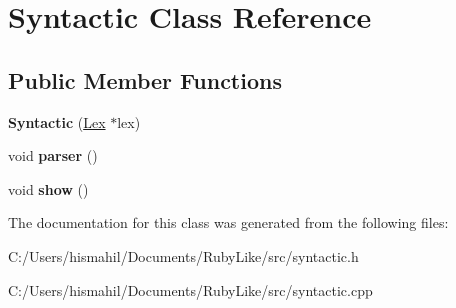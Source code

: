 \hypertarget{class_syntactic}{\section{Syntactic Class Reference}
\label{class_syntactic}
}
\subsection*{Public Member Functions}
\begin{DoxyCompactItemize}
\item 
\hypertarget{class_syntactic_ac94e5b2e82e2c0d2ad751b3f5ada8061}{{\bfseries Syntactic} (\hyperlink{class_lex}{Lex} $\ast$lex)}\label{class_syntactic_ac94e5b2e82e2c0d2ad751b3f5ada8061}

\item 
\hypertarget{class_syntactic_aa853bd9d18eee01a03dab6752ae215aa}{void {\bfseries parser} ()}\label{class_syntactic_aa853bd9d18eee01a03dab6752ae215aa}

\item 
\hypertarget{class_syntactic_aeab5765ad28f7a887885b84eab428016}{void {\bfseries show} ()}\label{class_syntactic_aeab5765ad28f7a887885b84eab428016}

\end{DoxyCompactItemize}


The documentation for this class was generated from the following files\-:\begin{DoxyCompactItemize}
\item 
C\-:/\-Users/hismahil/\-Documents/\-Ruby\-Like/src/syntactic.\-h\item 
C\-:/\-Users/hismahil/\-Documents/\-Ruby\-Like/src/syntactic.\-cpp\end{DoxyCompactItemize}
